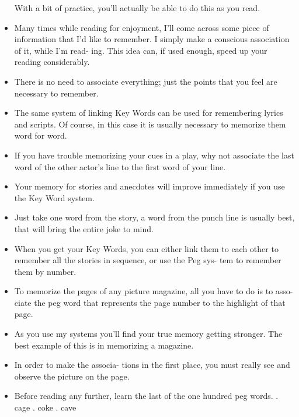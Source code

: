 \begin{itemize}
                \subitem With a bit of practice, you'll actually be able to do
            this as you read.
            \item Many times while reading for enjoyment, I'll come across
            some piece of information that I'd like to remember. I
            simply make a conscious association of it, while I'm read-
            ing. This idea can, if used enough, speed up your reading
            considerably.
            \item There is no need to associate everything; just the points that you feel are necessary to remember.
            \item The same system of linking Key Words can be used
            for remembering lyrics and scripts. Of course, in this case
            it is usually necessary to memorize them word for word.
            \item If
            you have trouble memorizing your cues in a play, why not
            associate the last word of the other actor's line to the first
            word of your line.
            \item Your memory for stories and anecdotes will improve
            immediately if you use the Key Word system.
            \item Just take one
            word from the story, a word from the punch line is usually
            best, that will bring the entire joke to mind.
            \item When you
            get your Key Words, you can either link them to each other to remember all the stories in sequence, or use the Peg sys-
            tem to remember them by number.
            \item To memorize the
            pages of any picture magazine, all you have to do is to asso-
            ciate the peg word that represents the page number to the
            highlight of that page.
            \item As you use my systems you'll find your
            true memory getting stronger. The best example of this is
            in memorizing a magazine.
            \item In order to make the associa-
            tions in the first place, you must really see and observe the
            picture on the page.
            \item Before reading any further, learn the last of the one
            hundred peg words.
                . cage
                . coke
                . cave

\end{itemize}
